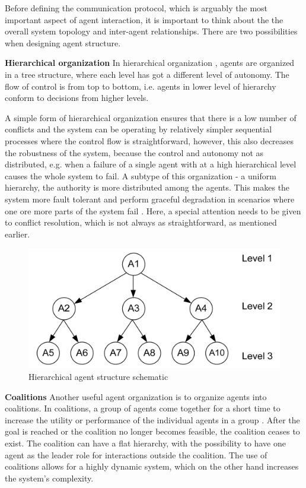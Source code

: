 \documentclass[main.tex]{subfiles}
\begin{document}
Before defining the communication protocol, which is arguably the most important aspect of agent 
interaction, it is important to think about the the overall system topology and inter-agent 
relationships. There are two possibilities when designing agent structure.

\textbf{Hierarchical organization}\newline
In hierarchical organization \cite{Damba2007}, agents are organized in a tree structure,
where each level has got a different level of autonomy. The flow of control is 
from top to bottom, i.e. agents in lower level of hierarchy conform to decisions 
from higher levels. 

A simple form of hierarchical organization ensures that there is a low number of conflicts and
the system can be operating by relatively simpler sequential processes where the control flow
is straightforward, however, this also decreases the robustness of the system, because the
control and autonomy not as distributed, e.g. when a failure of a single agent with at a high
hierarchical level causes the whole system to fail. A subtype of this organization - a 
uniform hierarchy, the authority is more distributed among the agents. This makes the
system more fault tolerant and perform graceful degradation in scenarios where one ore more
parts of the system fail \cite{ParasumannaGokulan2010}. Here, a special attention needs to be
given to conflict resolution, which is not always as straightforward, as mentioned earlier. 

\begin{figure}[htbp]
    \centering
    \includegraphics[width=.6\textwidth]{hierarchy.png}
    \caption{Hierarchical agent structure schematic \cite{ParasumannaGokulan2010}}
    \label{hierarchy}
\end{figure}

\textbf{Coalitions}\newline
Another useful agent organization is to organize agents into coalitions. In coalitions, a group of
agents come together for a short time to increase the utility or performance of the individual
agents in a group \cite{ParasumannaGokulan2010}. After the goal is reached or the coalition no 
longer becomes feasible, the coalition ceases to exist. The coalition can have a flat hierarchy, 
with the possibility to have one agent as the leader role for interactions outside the coalition. 
The use of coalitions allows for a highly dynamic system, which on the other hand increases the
system's complexity. 
\end{document}
